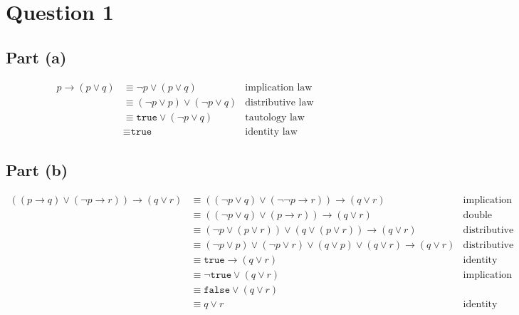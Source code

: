 \documentclass[11pt, a4paper]{article}
\begin{document}
\section*{Question 1}
\subsection*{Part (a)}
\begin{align*}
	p \to (p \lor q) &\equiv \neg p \lor (p \lor q)               & \text{implication law} \\
			 &\equiv (\neg p \lor p) \lor (\neg p \lor q) & \text{distributive law} \\
			 &\equiv \texttt{true} \lor (\neg p \lor q)   & \text{tautology law} \\
			 &\equiv \texttt{true}                        & \text{identity law}
\end{align*}

\subsection*{Part (b)}
\begin{align*}
	((p \to q) \lor (\neg p \to r)) \to (q \lor r) &\equiv ((\neg p \lor q) \lor (\neg \neg p \to r)) \to (q \lor r)                           & \text{implication law} \\
	                                               &\equiv ((\neg p \lor q) \lor (p \to r)) \to (q \lor r)                                     & \text{double negation law} \\
						       &\equiv (\neg p \lor (p \lor r)) \lor (q \lor (p \lor r)) \to (q \lor r)                    & \text{distributive law} \\
						       &\equiv (\neg p \lor p) \lor (\neg p \lor r) \lor (q \lor p) \lor (q \lor r) \to (q \lor r) & \text{distributive law} \\
						       &\equiv \texttt{true} \to (q \lor r)                                                        & \text{identity law} \\
						       &\equiv \neg \texttt{true} \lor (q \lor r)                                                  & \text{implication law} \\
						       &\equiv \texttt{false} \lor (q \lor r)                                                      & \\
						       &\equiv q \lor r                                                                            & \text{identity law}
\end{align*}
\end{document}
